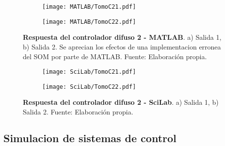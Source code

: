         \begin{figure}[htb]
            \centering
            \begin{subfigure}[t]{0.49\textwidth}
                \centering
                \texttt{[image: MATLAB/TomoC21.pdf]}
                \caption{}
                \label{fig:respuestaC21MATLAB}
            \end{subfigure}
            \hfill
            \begin{subfigure}[t]{0.49\textwidth}
                \centering
                \texttt{[image: MATLAB/TomoC22.pdf]}
                \caption{}
                \label{fig:respuestaC22MATLAB}
            \end{subfigure}
            
            \caption[Comparacion - Respuesta del controlador difuso 2 - MATLAB]{\textbf{Respuesta del controlador difuso 2 - MATLAB}. a) Salida 1, b) Salida 2. Se aprecian los efectos de una implementacion erronea del SOM por parte de MATLAB. Fuente: Elaboración propia. \label{fig:respuestaC2MATLAB}}
        \end{figure}

        \begin{figure}[htb]
            \centering
            \begin{subfigure}[t]{0.49\textwidth}
                \centering
                \texttt{[image: SciLab/TomoC21.pdf]}
                \caption{}
                \label{fig:respuestaC21SciLab}
            \end{subfigure}
            \hfill
            \begin{subfigure}[t]{0.49\textwidth}
                \centering
                \texttt{[image: SciLab/TomoC22.pdf]}
                \caption{}
                \label{fig:respuestaC22SciLab}
            \end{subfigure}
            
            \caption[Comparacion - Respuesta del controlador difuso 2 - SciLab]{\textbf{Respuesta del controlador difuso 2 - SciLab}. a) Salida 1, b) Salida 2. Fuente: Elaboración propia. \label{fig:respuestaC2SciLab}}
        \end{figure}

        \clearpage

    \subsection{Simulacion de sistemas de control}

























        
